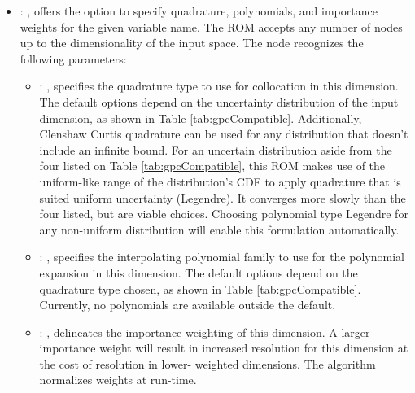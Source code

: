 \begin{itemize}
    \item {}: ,
      offers the option to specify quadrature, polynomials, and importance weights for the given
      variable name.  The ROM accepts any number of  nodes up to the
      dimensionality of the input space.
      The  node recognizes the following parameters:
        \begin{itemize}
          \item {}: ,
            specifies the quadrature type to use for collocation in this dimension.  The default
            options                   depend on the uncertainty distribution of the input dimension,
            as shown in Table                   \ref{tab:gpcCompatible}. Additionally, Clenshaw
            Curtis quadrature can be used for any                   distribution that doesn't
            include an infinite bound.                                      \nb For an uncertain distribution aside from
            the four listed on Table                   \ref{tab:gpcCompatible}, this ROM
            makes use of the uniform-like range of the distribution's CDF to apply quadrature that
            is                   suited uniform uncertainty (Legendre).  It converges more slowly
            than the four listed, but are                   viable choices.  Choosing polynomial
            type Legendre for any non-uniform distribution will                   enable this
            formulation automatically.
          \item {}: ,
            specifies the interpolating polynomial family to use for the polynomial expansion in
            this                   dimension.  The default options depend on the quadrature type
            chosen, as shown in Table                   \ref{tab:gpcCompatible}.  Currently, no
            polynomials are available outside the                   default. 
          \item {}: ,
            delineates the importance weighting of this dimension.  A larger importance weight will
            result in increased resolution for this dimension at the cost of resolution in lower-
            weighted                   dimensions.  The algorithm normalizes weights at run-time. 
      \end{itemize}
  \end{itemize}

